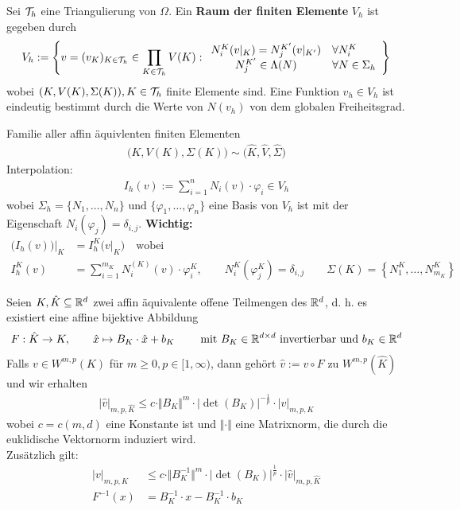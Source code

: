 \begin{definition}\enter
Sei $\mathcal{T}_h$ eine Triangulierung von $\Omega$. Ein \textbf{Raum der finiten Elemente} $V_h$ ist gegeben durch 
\begin{align*}
V_h:=\left\lbrace v=(v_{K})_{K\in\mathcal{T}_h}\in\prod\limits_{K\in\mathcal{T}_h} V(K):
\begin{array}{cl}
N_i^K(v|_K)=N_j^{K'}(v|_{K'}) &\forall N_i^K\\
N_j^{K'}\in\Lambda(N) &\forall N\in\Sigma_h
\end{array}
\right\rbrace
\end{align*}
wobei $(K,V(K),\Sigma(K)),K\in\mathcal{T}_h$ finite Elemente sind. Eine Funktion $v_h\in V_h$ ist eindeutig bestimmt durch die Werte von $N(v_h)$ von dem globalen Freiheitsgrad.
\end{definition}

Familie aller affin äquivlenten finiten Elementen
\begin{align*}
\big(K,V(K),\Sigma(K)\big)\sim\big(\hat{K},\hat{V},\hat{\Sigma}\big)
\end{align*}
Interpolation:
\begin{align*}
I_h(v):=\sum\limits_{i=1}^n N_i(v)\cdot\varphi_i\in V_h
\end{align*}
wobei $\Sigma_h=\lbrace N_1,\ldots,N_n\rbrace\text{ und }\lbrace\varphi_1,\ldots,\varphi_n\rbrace$ eine Basis von $V_h$ ist mit der Eigenschaft $N_i(\varphi_j)=\delta_{i,j}$.\nl
\textbf{Wichtig: }
\begin{align*}
\big(I_h(v)\big)\big|_K&=I_h^K\big(v|_K\big)\quad\text{wobei}\\ I_h^K(v)&=\sum\limits_{i=1}^{m_K} N_i^{(K)}(v)\cdot\varphi_i^K,\qquad N_i^K(\varphi_j^K)=\delta_{i,j}\qquad\Sigma(K)=\left\lbrace N_1^K,\ldots,N_{m_K}^K\right\rbrace
\end{align*}

\begin{theorem}\label{theorem4.9}
Seien $K,\hat{K}\subseteq\mathbb{R}^d$ zwei affin äquivalente offene  Teilmengen des $\mathbb{R}^d$, d. h. es existiert eine affine bijektive Abbildung
\begin{align*}
F:\hat{K}\to K,\qquad \hat{x}\mapsto B_K\cdot\hat{x}+ b_K\qquad\text{ mit } B_K\in\mathbb{R}^{d\times d}\text{ invertierbar und }b_K\in\mathbb{R}^d
\end{align*}
Falls $v\in W^{m,p}(K)$ für $m\geq0,p\in[1,\infty)$, dann gehört $\hat{v}:=v\circ F$ zu $W^{m,p}(\hat{K})$ und wir erhalten
\begin{align*}
\big|\hat{v}\big|_{m,p,\hat{K}}\leq c\cdot\Vert B_K\Vert^m\cdot\big|\det(B_K)\big|^{-\frac{1}{p}}\cdot|v|_{m,p,K}
\end{align*}
wobei $c=c(m,d)$ eine Konstante ist und $\Vert\cdot\Vert$ eine Matrixnorm, die durch die euklidische Vektornorm induziert wird.\\
Zusätzlich gilt:
\begin{align*}
|v|_{m,p,K}&\leq c\cdot\Vert B_K^{-1}\Vert^m\cdot\big|\det(B_K)\big|^{\frac{1}{p}}\cdot|\hat{v}|_{m,p,\hat{K}}\\
F^{-1}(x)&=B_K^{-1}\cdot x-B_K^{-1}\cdot b_K
\end{align*}
\end{theorem}

